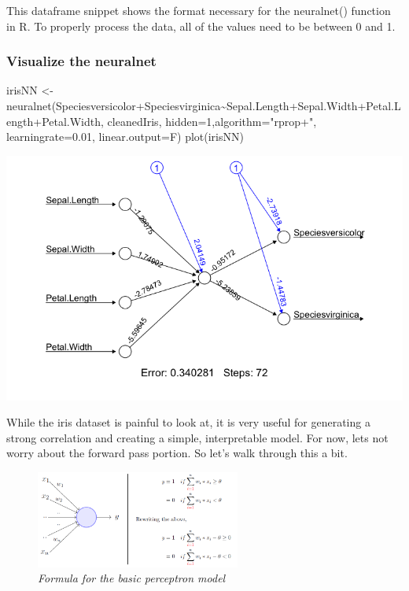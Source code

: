 \documentclass[
]{article}
\newenvironment{Shaded}{\begin{snugshade}}{\end{snugshade}}
\newcommand{\AttributeTok}[1]{\textcolor[rgb]{0.77,0.63,0.00}{#1}}
\newcommand{\DecValTok}[1]{\textcolor[rgb]{0.00,0.00,0.81}{#1}}
\newcommand{\FloatTok}[1]{\textcolor[rgb]{0.00,0.00,0.81}{#1}}
\newcommand{\FunctionTok}[1]{\textcolor[rgb]{0.00,0.00,0.00}{#1}}
\newcommand{\NormalTok}[1]{#1}
\newcommand{\OtherTok}[1]{\textcolor[rgb]{0.56,0.35,0.01}{#1}}
\newcommand{\SpecialCharTok}[1]{\textcolor[rgb]{0.00,0.00,0.00}{#1}}
\newcommand{\StringTok}[1]{\textcolor[rgb]{0.31,0.60,0.02}{#1}}
\begin{document}
This dataframe snippet shows the format necessary for the neuralnet()
function in R. To properly process the data, all of the values need to
be between 0 and 1.

\hypertarget{visualize-the-neuralnet}{%
\subsubsection{Visualize the neuralnet}\label{visualize-the-neuralnet}}

\begin{Shaded}
\begin{Highlighting}[]
\NormalTok{irisNN }\OtherTok{\textless{}{-}} \FunctionTok{neuralnet}\NormalTok{(Speciesversicolor}\SpecialCharTok{+}\NormalTok{Speciesvirginica}\SpecialCharTok{\textasciitilde{}}\NormalTok{Sepal.Length}\SpecialCharTok{+}\NormalTok{Sepal.Width}\SpecialCharTok{+}\NormalTok{Petal.Length}\SpecialCharTok{+}\NormalTok{Petal.Width,}
\NormalTok{                    cleanedIris, }\AttributeTok{hidden=}\DecValTok{1}\NormalTok{,}\AttributeTok{algorithm=}\StringTok{"rprop+"}\NormalTok{,}
                    \AttributeTok{learningrate=}\FloatTok{0.01}\NormalTok{, }\AttributeTok{linear.output=}\NormalTok{F)}
\FunctionTok{plot}\NormalTok{(irisNN)}
\end{Highlighting}
\end{Shaded}

\includegraphics{media/irisNet.png}

While the iris dataset is painful to look at, it is very useful for
generating a strong correlation and creating a simple, interpretable
model. For now, lets not worry about the forward pass portion. So let's
walk through this a bit.

\begin{figure}
\centering
\includegraphics[width=0.6\textwidth,height=\textheight]{media/perceptronModel.png}
\caption{\emph{Formula for the basic perceptron model}}
\end{figure}
\end{document}
